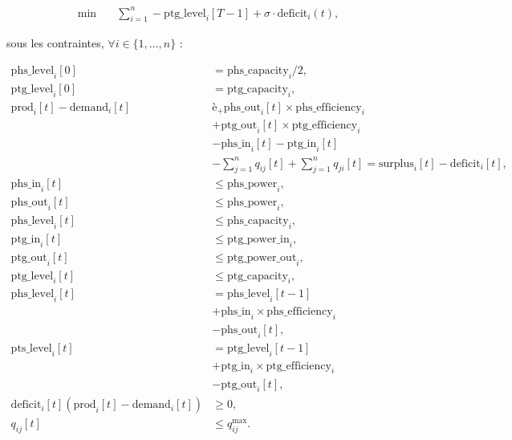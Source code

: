 \documentclass[12pt,a4paper]{article}
\begin{document}
\begin{tcolorbox}[colback=violet!5!white, colframe=blue!75!black, breakable]
\begin{align*}
\min \quad 
& \sum_{i=1}^n - \mathrm{ptg\_level}_i[T-1]
+ \sigma \cdot \mathrm{deficit}_i(t),
\end{align*}

sous les contraintes, $\forall i \in \{1,\dots,n\}$ :

\begin{align}
\mathrm{phs\_level}_i[0] &=\mathrm{phs\_capacity}_i/2,\\
\mathrm{ptg\_level}_i[0] &= \mathrm{ptg\_capacity}_i,\\[0.2cm]
\mathrm{prod}_i[t] - \mathrm{demand}_i[t] &è_+ \mathrm{phs\_out}_i[t]\times\mathrm{phs\_efficiency}_i \nonumber \\
&+ \mathrm{ptg\_out}_i[t]\times\mathrm{ptg\_efficiency}_i \nonumber \\
&- \mathrm{phs\_in}_i[t]
- \mathrm{ptg\_in}_i[t] \nonumber \\
&- \sum_{j=1}^n q_{ij}[t]
+ \sum_{j=1}^n q_{ji}[t]
= \mathrm{surplus}_i[t]-\mathrm{deficit}_i[t], \\[0.2cm]
\mathrm{phs\_in}_i[t] &\le \mathrm{phs\_power}_i,\\
\mathrm{phs\_out}_i[t] &\le \mathrm{phs\_power}_i,\\
\mathrm{phs\_level}_i[t] &\le \mathrm{phs\_capacity}_i,\\
\mathrm{ptg\_in}_i[t] &\le \mathrm{ptg\_power\_in}_i,\\
\mathrm{ptg\_out}_i[t] &\le \mathrm{ptg\_power\_out}_i,\\
\mathrm{ptg\_level}_i[t] &\le \mathrm{ptg\_capacity}_i,\\
\mathrm{phs\_level}_i[t] &= \mathrm{phs\_level}_i[t-1] \nonumber \\
&+ \mathrm{phs\_in}_i\times\mathrm{phs\_efficiency}_i \nonumber \\
& -\mathrm{phs\_out}_i[t],\\
\mathrm{pts\_level}_i[t] &= \mathrm{ptg\_level}_i[t-1] \nonumber \\
&+ \mathrm{ptg\_in}_i\times\mathrm{ptg\_efficiency}_i \nonumber \\
& -\mathrm{ptg\_out}_i[t],\\
\mathrm{deficit}_i[t](\mathrm{prod}_i[t] - \mathrm{demand}_i[t])&\ge 0,\\
q_{ij}[t] &\le q^{\max}_{ij}.
\end{align}\\
\end{tcolorbox}
\end{document}
